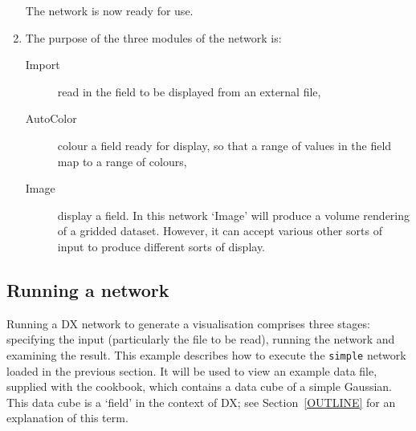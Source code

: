 \documentclass[twoside,11pt]{article}
\begin{document}
\begin{enumerate}
   The network is now ready for use.

  \item The purpose of the three modules of the network is:

  \begin{description}

    \item[Import] read in the field to be displayed from an external
     file,

    \item[AutoColor] colour a field ready for display, so that a range
     of values in the field map to a range of colours,

    \item[Image] display a field. In this network `Image' will produce a
     volume rendering of a gridded dataset. However, it can accept
     various other sorts of input to produce different sorts of display.

  \end{description}

\end{enumerate}

\subsection{\label{RUNNET}Running a network}


Running a DX network to generate a visualisation comprises three stages:
specifying the input (particularly the file to be read), running the
network and examining the result. This example describes how to execute
the {\tt simple} network loaded in the previous section. It will be used
to view an example data file, supplied with the cookbook, which contains
a data cube of a simple Gaussian. This data cube is a `field' in the
context of DX; see Section~\ref{OUTLINE} for an explanation of this
term.
\end{document}
